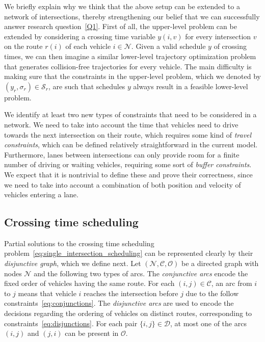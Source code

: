 \documentclass{article}
\theoremstyle{definition}
\theoremstyle{plain}
\begin{document}

We briefly explain why we think that the above setup can be extended to a
network of intersections, thereby strengthening our belief that we can
successfully answer research question~\ref{Q1}.
%
First of all, the upper-level problem can be extended by considering a crossing
time variable $y(i, v)$ for every intersection $v$ on the route $r(i)$ of each
vehicle $i\in \mathcal{N}$. Given a valid schedule $y$ of crossing times, we can
then imagine a similar lower-level trajectory optimization problem that
generates collision-free trajectories for every vehicle. The main difficulty is
making sure that the constraints in the upper-level problem, which we denoted by
$(y_{r}, \sigma_{r}) \in \mathcal{S}_{r}$, are such that schedules $y$ always
result in a feasible lower-level problem.

We identify at least two new types of constraints that need to be considered in
a network. We need to take into account the time that vehicles need to drive
towards the next intersection on their route, which requires some kind of
\textit{travel constraints}, which can be defined relatively straightforward in
the current model. Furthermore, lanes between intersections can only provide
room for a finite number of driving or waiting vehicles, requiring some sort of
\textit{buffer constraints}. We expect that it is nontrivial to define these and
prove their correctness, since we need to take into account a combination of
both position and velocity of vehicles entering a lane.


\subsection{Crossing time scheduling}
\label{A3}

Partial solutions to the crossing time scheduling
problem~\eqref{eq:single_intersection_scheduling} can be represented
clearly by their \textit{disjunctive graph}, which we define next. Let
$(\mathcal{N}, \mathcal{C}, \mathcal{O})$ be a directed graph with nodes
$\mathcal{N}$ and the following two types of arcs. The \textit{conjunctive arcs}
encode the fixed order of vehicles having the same route. For each
$(i,j) \in \mathcal{C}$, an arc from $i$ to $j$ means that vehicle $i$ reaches
the intersection before $j$ due to the follow
constraints~\eqref{eq:conjunctions}. The \textit{disjunctive arcs} are used to
encode the decisions regarding the ordering of vehicles on distinct routes,
corresponding to constraints~\eqref{eq:disjunctions}. For each pair
$\{i,j\} \in \mathcal{D}$, at most one of the arcs $(i,j)$ and $(j,i)$ can be
present in $\mathcal{O}$.
\end{document}
